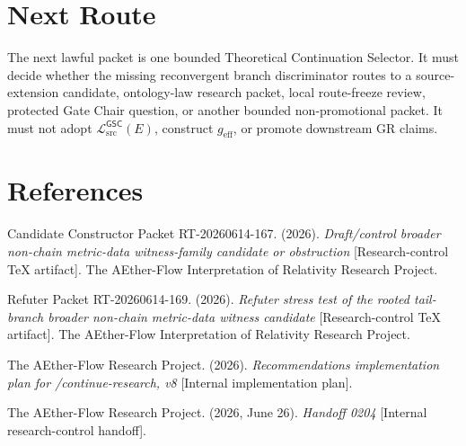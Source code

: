 \documentclass[11pt]{article}
\newcommand{\MetricData}{\mathcal{L}_{\mathrm{src}}^{\mathsf{GSC}}}
\newcommand{\geff}{g_{\mathrm{eff}}}
\begin{document}
\section{Next Route}

The next lawful packet is one bounded Theoretical Continuation Selector. It
must decide whether the missing reconvergent branch discriminator routes to a
source-extension candidate, ontology-law research packet, local route-freeze
review, protected Gate Chair question, or another bounded non-promotional
packet. It must not adopt \(\MetricData(E)\), construct \(\geff\), or promote
downstream GR claims.

\section*{References}

Candidate Constructor Packet RT-20260614-167. (2026). \textit{Draft/control
broader non-chain metric-data witness-family candidate or obstruction}
[Research-control TeX artifact]. The AEther-Flow Interpretation of Relativity
Research Project.

Refuter Packet RT-20260614-169. (2026). \textit{Refuter stress test of the
rooted tail-branch broader non-chain metric-data witness candidate}
[Research-control TeX artifact]. The AEther-Flow Interpretation of Relativity
Research Project.

The AEther-Flow Research Project. (2026). \textit{Recommendations
implementation plan for /continue-research, v8} [Internal implementation
plan].

The AEther-Flow Research Project. (2026, June 26). \textit{Handoff 0204}
[Internal research-control handoff].
\end{document}

